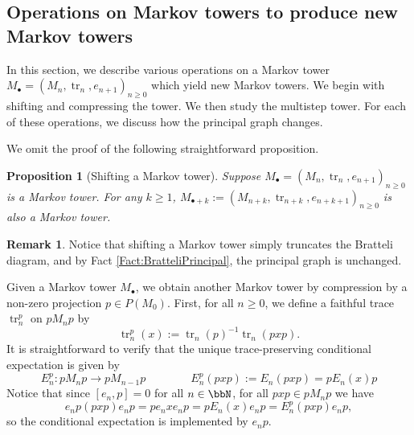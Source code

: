\documentclass[11pt]{article}
\theoremstyle{plain}
\newtheorem{prop}[thm]{Proposition}
\theoremstyle{definition}
\newtheorem{remark}[thm]{Remark}
\DeclareMathOperator{\tr}{tr}
\begin{document}
\subsection{Operations on Markov towers to produce new Markov towers}
\label{sec:OperationsOnMarkovTowers}

In this section, we describe various operations on a Markov tower $M_\bullet = (M_n, \tr_n, e_{n+1})_{n\geq 0}$ which yield new Markov towers.
We begin with shifting and compressing the tower.
We then study the multistep tower.
For each of these operations, we discuss how the principal graph changes. 

We omit the proof of the following straightforward proposition.
\begin{prop}[Shifting a Markov tower]
\label{prop:ShiftMarkovTower}
Suppose $M_\bullet=(M_n, \tr_n, e_{n+1})_{n\geq 0}$ is a Markov tower.
For any $k\geq 1$, $M_{\bullet+k}:=(M_{n+k}, \tr_{n+k}, e_{n+k+1})_{n\geq 0}$ is also a Markov tower.
\end{prop}

\begin{remark}
 \label{Rem:ShiftTowerEffects}
Notice that shifting a Markov tower simply truncates the Bratteli diagram, and by Fact \ref{Fact:BratteliPrincipal}, the principal graph is unchanged.
\end{remark}

Given a Markov tower $M_\bullet$, we obtain another Markov tower by compression by a non-zero projection $p\in P(M_0)$.
First, for all $n\geq 0$, we define a faithful trace $\tr_n^p$ on $pM_n p$ by
\begin{equation}
\label{eq:CompressedTrace}
\tr^p_n(x) := \tr_n(p)^{-1}\tr_n(pxp).
\end{equation}
It is straightforward to verify that the unique trace-preserving conditional expectation is given by 
\begin{equation}
\label{eq:CompressedConditionalExpectation}
E^p_n : pM_np \to pM_{n-1}p
\qquad
\qquad
E^p_n(pxp) := E_n(pxp) = pE_n(x)p
\end{equation}
Notice that since $[e_n,p] = 0$ for all $n\in \bbN$, for all $pxp \in pM_n p$ we have 
\begin{equation}
\label{eq:CompressionImplementsConditionalExpectation}
e_np (pxp) e_np = p e_nxe_np = pE_n(x)e_np = E_n^p(pxp)e_np,
\end{equation}
so the conditional expectation is implemented by $e_np$.
\end{document}
